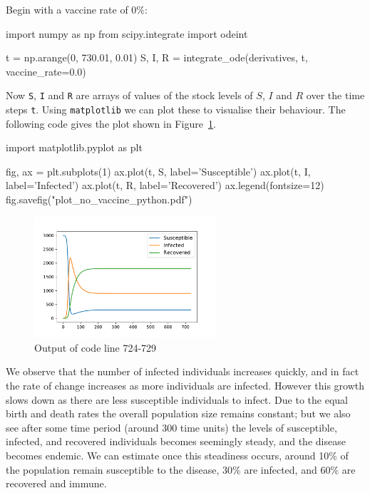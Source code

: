 Begin with a vaccine rate of 0\%:

\begin{pyin}
import numpy as np
from scipy.integrate import odeint

t = np.arange(0, 730.01, 0.01)
S, I, R = integrate_ode(derivatives, t, vaccine_rate=0.0)
\end{pyin}

Now \texttt{S}, \texttt{I} and \texttt{R}
are arrays of values of the stock levels of $S$, $I$ and $R$ over the time
steps \texttt{t}.
Using \texttt{matplotlib} we can plot these to visualise their
behaviour.
The following code gives the plot shown in Figure~\ref{fig:plot_no_vaccine}.


\begin{pyin}
import matplotlib.pyplot as plt

fig, ax = plt.subplots(1)
ax.plot(t, S, label='Susceptible')
ax.plot(t, I, label='Infected')
ax.plot(t, R, label='Recovered')
ax.legend(fontsize=12)
fig.savefig("plot_no_vaccine_python.pdf")
\end{pyin}


\begin{figure}
\begin{center}
\includegraphics[width=0.6\textwidth]{./assets/plot_no_vaccine_python.pdf}
\end{center}
\caption{Output of code line 724-729}
\label{fig:plot_no_vaccine}
\end{figure}

We observe that the number of infected individuals increases quickly, and in
fact the rate of change increases as more individuals are infected. However
this growth slows down as there are less susceptible individuals to infect. Due
to the equal birth and death rates the overall population size remains constant;
but we also see after some time period (around 300 time units) the levels of
susceptible, infected, and recovered individuals becomes seemingly steady, and
the disease becomes endemic. We can estimate once this steadiness occurs, around
10\% of the population remain susceptible to the disease, 30\% are infected, and
60\% are recovered and immune.

